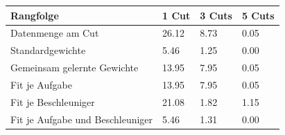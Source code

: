 \begin{tabular}{@{}llll@{}}
\toprule
Rangfolge & 1 Cut & 3 Cuts & 5 Cuts \\
\midrule
Datenmenge am Cut & 26.12 & 8.73 & 0.05 \\
Standardgewichte & 5.46 & 1.25 & 0.00 \\
Gemeinsam gelernte Gewichte & 13.95 & 7.95 & 0.05 \\
Fit je Aufgabe & 13.95 & 7.95 & 0.05 \\
Fit je Beschleuniger & 21.08 & 1.82 & 1.15 \\
Fit je Aufgabe und Beschleuniger & 5.46 & 1.31 & 0.00 \\
\bottomrule
\end{tabular}
